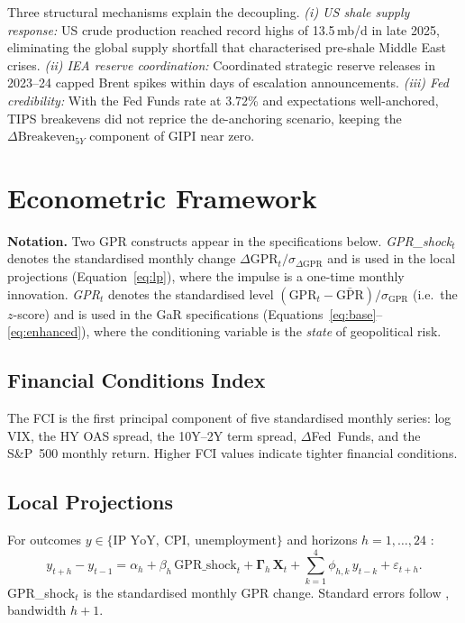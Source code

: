 \documentclass[12pt]{article}
\begin{document}
Three structural mechanisms explain the decoupling.
\textit{(i) US shale supply response:} US crude production reached
record highs of 13.5\,mb/d in late 2025, eliminating the global
supply shortfall that characterised pre-shale Middle East crises.
\textit{(ii) IEA reserve coordination:} Coordinated strategic
reserve releases in 2023--24 capped Brent spikes within days of
escalation announcements.
\textit{(iii) Fed credibility:} With the Fed Funds rate at 3.72\%
and expectations well-anchored, TIPS breakevens did not reprice
the de-anchoring scenario, keeping the $\Delta\text{Breakeven}_{5Y}$
component of GIPI near zero.

\section{Econometric Framework}\label{sec:framework}

\noindent\textbf{Notation.}
Two GPR constructs appear in the specifications below.
\textit{GPR\_shock}$_t$ denotes the standardised monthly change
$\Delta\text{GPR}_t / \sigma_{\Delta\text{GPR}}$ and is used in the
local projections (Equation~\ref{eq:lp}), where the impulse is a
one-time monthly innovation.
\textit{GPR}$_t$ denotes the standardised level
$(\text{GPR}_t - \bar{\text{GPR}}) / \sigma_{\text{GPR}}$ (i.e.\ the
$z$-score) and is used in the GaR specifications
(Equations~\ref{eq:base}--\ref{eq:enhanced}), where the conditioning
variable is the \textit{state} of geopolitical risk.

\subsection{Financial Conditions Index}

The FCI is the first principal component of five standardised monthly series:
log VIX, the HY OAS spread, the 10Y--2Y term spread, $\Delta$Fed~Funds,
and the S\&P~500 monthly return.
Higher FCI values indicate tighter financial conditions.

\subsection{Local Projections}

For outcomes $y \in \{\text{IP YoY},\ \text{CPI},\ \text{unemployment}\}$
and horizons $h = 1,\ldots,24$ \citep{jorda2005}:
\begin{equation}
y_{t+h} - y_{t-1} = \alpha_h + \beta_h\,\text{GPR\_shock}_t
+ \boldsymbol{\Gamma}_h\,\mathbf{X}_t
+ \sum_{k=1}^{4}\phi_{h,k}\,y_{t-k} + \varepsilon_{t+h}.
\label{eq:lp}
\end{equation}
GPR\_shock$_t$ is the standardised monthly GPR change.
Standard errors follow \citet{newey1987}, bandwidth $h+1$.
\end{document}
